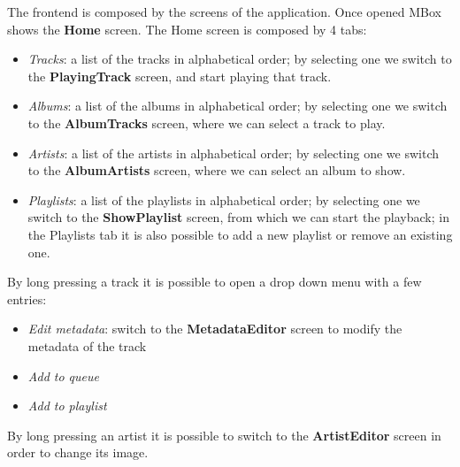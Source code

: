 \documentclass{article}
\begin{document}
The frontend is composed by the screens of the application. Once opened MBox
shows the \textbf{Home} screen. The Home screen is composed by 4 tabs:
\begin{itemize}
    \item \textit{Tracks}: a list of the tracks in alphabetical order; by
        selecting one we switch to the \textbf{PlayingTrack} screen, and start
        playing that track.
    \item \textit{Albums}: a list of the albums in alphabetical order; by
        selecting one we switch to the \textbf{AlbumTracks} screen, where we can
        select a track to play. 
    \item \textit{Artists}: a list of the artists in alphabetical order; by
        selecting one we switch to the \textbf{AlbumArtists} screen, where  we
        can select an album to show.
    \item \textit{Playlists}: a list of the playlists in alphabetical order; by
        selecting one we switch to the \textbf{ShowPlaylist} screen, from which
        we can start the playback; in the Playlists tab it is also possible to
        add a new playlist or remove an existing one.
\end{itemize}

By long pressing a track it is possible to open a drop down menu with a few
entries:
\begin{itemize}
    \item \textit{Edit metadata}: switch to the \textbf{MetadataEditor} screen
        to modify the metadata of the track
    \item \textit{Add to queue}
    \item \textit{Add to playlist}
\end{itemize}

By long pressing an artist it is possible to switch to the
\textbf{ArtistEditor} screen in order to change its image.
\end{document}
